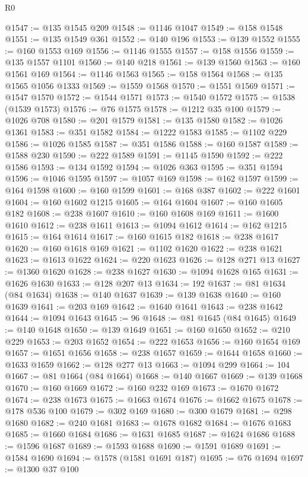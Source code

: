 \begin{lexlean}{R0}
\begin{coremodule}
@1547 := @135 @1545 @209
@1548 := @1146 @1047
@1549 := @158 @1548
@1551 := @135 @1549 @361
@1552 := @140 @196
@1553 := @139 @1552
@1555 := @160 @1553 @169
@1556 := @1146 @1555
@1557 := @158 @1556
@1559 := @135 @1557 @1101
@1560 := @140 @218
@1561 := @139 @1560
@1563 := @160 @1561 @169
@1564 := @1146 @1563
@1565 := @158 @1564
@1568 := @135 @1565 @1056 @1333
@1569 := @1559 @1568
@1570 := @1551 @1569
@1571 := @1547 @1570
@1572 := @1544 @1571
@1573 := @1540 @1572
@1575 := @1538 (@1539 @1573)
@1576 := @76 @1575
@1578 := @1212 @35 @100
@1579 := @1026 @708
@1580 := @201 @1579
@1581 := @135 @1580
@1582 := @1026 @1361
@1583 := @351 @1582
@1584 := @1222 @1583
@1585 := @1102 @229
@1586 := @1026 @1585
@1587 := @351 @1586
@1588 := @160 @1587
@1589 := @1588 @230
@1590 := @222 @1589
@1591 := @1145 @1590
@1592 := @222 @1586
@1593 := @134 @1592
@1594 := @1026 @363
@1595 := @351 @1594
@1596 := @1046 @1595
@1597 := @1057 @169
@1598 := @162 @1597
@1599 := @164 @1598
@1600 := @160 @1599
@1601 := @168 @387
@1602 := @222 @1601
@1604 := @160 @1602 @1215
@1605 := @164 @1604
@1607 := @160 @1605 @182
@1608 := @238 @1607
@1610 := @160 @1608 @169
@1611 := @1600 @1610
@1612 := @238 @1611
@1613 := @1094 @1612
@1614 := @162 @1215
@1615 := @164 @1614
@1617 := @160 @1615 @182
@1618 := @238 @1617
@1620 := @160 @1618 @169
@1621 := @1102 @1620
@1622 := @238 @1621
@1623 := @1613 @1622
@1624 := @220 @1623
@1626 := @128 @271 @13
@1627 := @1360 @1620
@1628 := @238 @1627
@1630 := @1094 @1628 @165
@1631 := @1626 @1630
@1633 := @128 @207 @13
@1634 := 192
@1637 := @81 @1634 (@84 @1634)
@1638 := @140 @1637
@1639 := @139 @1638
@1640 := @160 @1639
@1641 := @203 @169
@1642 := @1640 @1641
@1643 := @238 @1642
@1644 := @1094 @1643
@1645 := 96
@1648 := @81 @1645 (@84 @1645)
@1649 := @140 @1648
@1650 := @139 @1649
@1651 := @160 @1650
@1652 := @210 @229
@1653 := @203 @1652
@1654 := @222 @1653
@1656 := @160 @1654 @169
@1657 := @1651 @1656
@1658 := @238 @1657
@1659 := @1644 @1658
@1660 := @1633 @1659
@1662 := @128 @277 @13
@1663 := @1094 @299
@1664 := 104
@1667 := @81 @1664 (@84 @1664)
@1668 := @140 @1667
@1669 := @139 @1668
@1670 := @160 @1669
@1672 := @160 @232 @169
@1673 := @1670 @1672
@1674 := @238 @1673
@1675 := @1663 @1674
@1676 := @1662 @1675
@1678 := @178 @536 @100
@1679 := @302 @169
@1680 := @300 @1679
@1681 := @298 @1680
@1682 := @240 @1681
@1683 := @1678 @1682
@1684 := @1676 @1683
@1685 := @1660 @1684
@1686 := @1631 @1685
@1687 := @1624 @1686
@1688 := @1596 @1687
@1689 := @1593 @1688
@1690 := @1591 @1689
@1691 := @1584 @1690
@1694 := @1578 (@1581 @1691 @187)
@1695 := @76 @1694
@1697 := @1300 @37 @100

\end{coremodule}
\end{lexlean}
